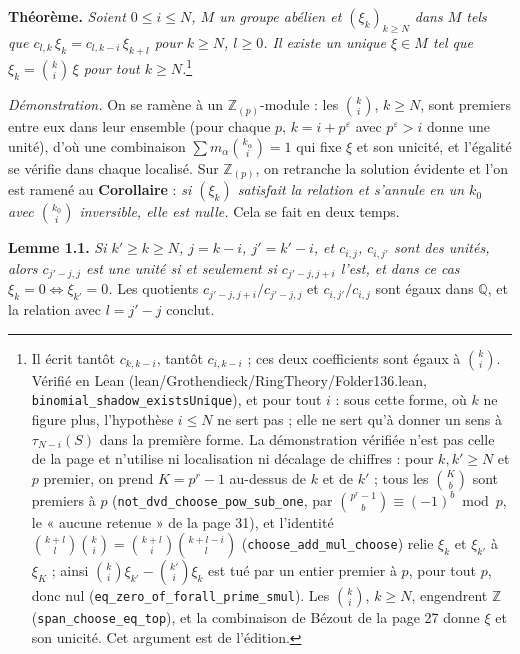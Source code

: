 \documentclass[11pt,a4paper]{article}
\begin{document}
\textbf{Théorème.} \emph{Soient $0 \leq i \leq N$, $M$ un groupe abélien et
$(\xi_k)_{k \geq N}$ dans $M$ tels que $c_{l,k}\,\xi_k = c_{l,k-i}\,\xi_{k+l}$
pour $k \geq N$, $l \geq 0$. Il existe un unique $\xi \in M$ tel que $\xi_k =
\binom{k}{i}\,\xi$ pour tout $k \geq N$.}\footnote{Il écrit tantôt
$c_{k,k-i}$, tantôt $c_{i,k-i}$ ; ces deux coefficients sont égaux à
$\binom{k}{i}$. Vérifié en Lean (lean/Grothendieck/RingTheory/Folder136.lean,
\texttt{binomial\_shadow\_existsUnique}), et pour tout $i$ : sous cette forme,
où $k$ ne figure plus, l'hypothèse $i \leq N$ ne sert pas ; elle ne sert qu'à
donner un sens à $\tau_{N-i}(S)$ dans la première forme. La démonstration
vérifiée n'est pas celle de la page et n'utilise ni localisation ni décalage
de chiffres : pour $k, k' \geq N$ et $p$ premier, on prend $K = p^r - 1$
au-dessus de $k$ et de $k'$ ; tous les $\binom{K}{b}$ sont premiers à $p$
(\texttt{not\_dvd\_choose\_pow\_sub\_one}, par $\binom{p^r - 1}{b} \equiv
(-1)^b \bmod p$, le « aucune retenue » de la page 31), et l'identité
$\binom{k+l}{l}\binom{k}{i} = \binom{k+l}{i}\binom{k+l-i}{l}$
(\texttt{choose\_add\_mul\_choose}) relie $\xi_k$ et $\xi_{k'}$ à $\xi_K$ ;
ainsi $\binom{k}{i}\xi_{k'} - \binom{k'}{i}\xi_k$ est tué par un entier
premier à $p$, pour tout $p$, donc nul (\texttt{eq\_zero\_of\_forall\_prime\_smul}).
Les $\binom{k}{i}$, $k \geq N$, engendrent $\mathbb{Z}$
(\texttt{span\_choose\_eq\_top}), et la combinaison de Bézout de la page 27
donne $\xi$ et son unicité. Cet argument est de l'édition.}

\emph{Démonstration.} On se ramène à un $\mathbb{Z}_{(p)}$-module : les
$\binom{k}{i}$, $k \geq N$, sont premiers entre eux dans leur ensemble (pour
chaque $p$, $k = i + p^\varepsilon$ avec $p^\varepsilon > i$ donne une unité),
d'où une combinaison $\sum m_\alpha \binom{k_\alpha}{i} = 1$ qui fixe $\xi$ et
son unicité, et l'égalité se vérifie dans chaque localisé. Sur
$\mathbb{Z}_{(p)}$, on retranche la solution évidente et l'on est ramené au
\textbf{Corollaire} : \emph{si $(\xi_k)$ satisfait la relation et s'annule en un
$k_0$ avec $\binom{k_0}{i}$ inversible, elle est nulle.} Cela se fait en deux
temps.

\textbf{Lemme 1.1.} \emph{Si $k' \geq k \geq N$, $j = k - i$, $j' = k'-i$, et
$c_{i,j}$, $c_{i,j'}$ sont des unités, alors $c_{j'-j, j}$ est une unité si et
seulement si $c_{j'-j, j+i}$ l'est, et dans ce cas $\xi_k = 0 \iff \xi_{k'} =
0$.} Les quotients $c_{j'-j,j+i}/c_{j'-j,j}$ et $c_{i,j'}/c_{i,j}$ sont égaux
dans $\mathbb{Q}$, et la relation avec $l = j'-j$ conclut.
\end{document}
